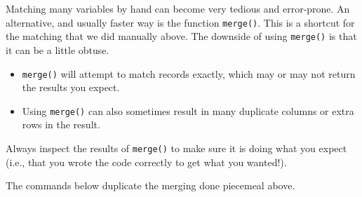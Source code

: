\documentclass[
  13,
  letterpaper,
]{report}
\begin{document}
Matching many variables by hand can become very tedious and error-prone.
An alternative, and usually faster way is the function \texttt{merge()}.
This is a shortcut for the matching that we did manually above. The
downside of using \texttt{merge()} is that it can be a little obtuse.

\begin{itemize}
\item
  \texttt{merge()} will attempt to match records exactly, which may or
  may not return the results you expect.
\item
  Using \texttt{merge()} can also sometimes result in many duplicate
  columns or extra rows in the result.
\end{itemize}

Always inspect the results of \texttt{merge()} to make sure it is doing
what you expect (i.e., that you wrote the code correctly to get what you
wanted!).

The commands below duplicate the merging done piecemeal above.
\end{document}
